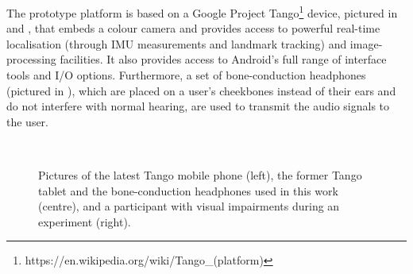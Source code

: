 \documentclass[]{interact}
\begin{document}
The prototype platform is based on a Google Project Tango\footnote{https://en.wikipedia.org/wiki/Tango\_(platform)} device, pictured in  and , that embeds a colour camera and provides access to powerful real-time localisation (through IMU measurements and landmark tracking) and image-processing facilities. 
It also provides access to Android's full range of interface tools and I/O options. 
Furthermore, a set of bone-conduction headphones (pictured in ), which are placed on a user's cheekbones instead of their ears and do not interfere with normal hearing, are used to transmit the audio signals to the user.

\begin{figure}[t]
  \centering
~
~
  \caption{Pictures of the latest Tango mobile phone (left), the former Tango tablet and the bone-conduction headphones used in this work (centre), and a participant with visual impairments during an experiment (right).}
\end{figure}
\end{document}
